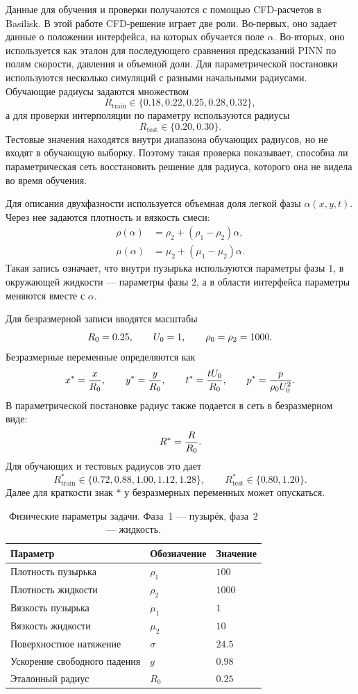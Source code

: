 Данные для обучения и проверки получаются с помощью CFD-расчетов в Basilisk.
В этой работе CFD-решение играет две роли. Во-первых, оно задает данные о
положении интерфейса, на которых обучается поле \(\alpha\). Во-вторых, оно
используется как эталон для последующего сравнения предсказаний PINN по полям
скорости, давления и объемной доли. Для параметрической постановки используются
несколько симуляций с разными начальными радиусами. Обучающие радиусы задаются
множеством
\[
    R_{\mathrm{train}}\in\{0.18,0.22,0.25,0.28,0.32\},
\]
а для проверки интерполяции по параметру используются радиусы
\[
    R_{\mathrm{test}}\in\{0.20,0.30\}.
\]
Тестовые значения находятся внутри диапазона обучающих радиусов, но не входят в
обучающую выборку. Поэтому такая проверка показывает, способна ли
параметрическая сеть восстановить решение для радиуса, которого она не видела
во время обучения.

Для описания двухфазности используется объемная доля легкой фазы
\(\alpha(x,y,t)\). Через нее задаются плотность и вязкость смеси:
\begin{align}
    \rho(\alpha) &= \rho_2 + (\rho_1-\rho_2)\alpha, \\
    \mu(\alpha) &= \mu_2 + (\mu_1-\mu_2)\alpha.
    \label{eq:chapter2_rho_mu}
\end{align}
Такая запись означает, что внутри пузырька используются параметры фазы \(1\), в
окружающей жидкости --- параметры фазы \(2\), а в области интерфейса параметры
меняются вместе с \(\alpha\).

Для безразмерной записи вводятся масштабы
\[
    R_0=0.25,\qquad U_0=1,\qquad \rho_0=\rho_2=1000.
\]
Безразмерные переменные определяются как
\[
    x^*=\frac{x}{R_0},\qquad
    y^*=\frac{y}{R_0},\qquad
    t^*=\frac{tU_0}{R_0},\qquad
    p^*=\frac{p}{\rho_0 U_0^2}.
\]
В параметрической постановке радиус также подается в сеть в безразмерном виде:
\[
    R^*=\frac{R}{R_0}.
\]
Для обучающих и тестовых радиусов это дает
\[
    R^*_{\mathrm{train}}\in\{0.72,0.88,1.00,1.12,1.28\},
    \qquad
    R^*_{\mathrm{test}}\in\{0.80,1.20\}.
\]
Далее для краткости знак \(*\) у безразмерных переменных может опускаться.

\begin{table}[H]
\centering
\caption{Физические параметры задачи. Фаза~1 --- пузырёк, фаза~2 --- жидкость.}
\label{tab:params}
\begin{tabular}{lll}
\hline
Параметр & Обозначение & Значение \\
\hline
Плотность пузырька   & $\rho_1$ & $100$ \\
Плотность жидкости   & $\rho_2$ & $1000$ \\
Вязкость пузырька    & $\mu_1$  & $1$ \\
Вязкость жидкости    & $\mu_2$  & $10$ \\
Поверхностное натяжение & $\sigma$ & $24.5$ \\
Ускорение свободного падения & $g$ & $0.98$ \\
Эталонный радиус     & $R_0$    & $0.25$ \\
\hline
\end{tabular}
\end{table}

